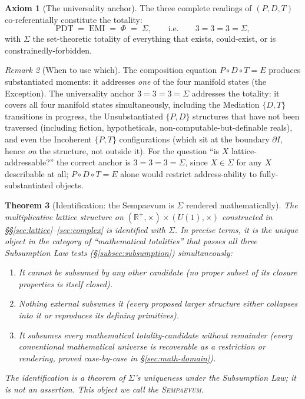 \documentclass[11pt,a4paper]{article}
\newtheorem{theorem}{Theorem}[section]
\theoremstyle{definition}
\newtheorem{axiom}[theorem]{Axiom}
\theoremstyle{remark}
\newtheorem{remark}[theorem]{Remark}
\newcommand{\R}{\mathbb{R}}
\newcommand{\Sempaevum}{\textsc{Sempaevum}}
\begin{document}
\begin{axiom}[The universality anchor]\label{ax:anchor}
The three complete readings of $(P,D,T)$ co-referentially constitute the totality:
\[
\mathrm{PDT} \;=\; \mathrm{EMI} \;=\; \Phi \;=\; \Sigma, \qquad \text{i.e.} \qquad 3=3=3=\Sigma,
\]
with $\Sigma$ the set-theoretic totality of everything that exists, could-exist, or is constrainedly-forbidden.
\end{axiom}

\begin{remark}[When to use which]
The composition equation $P\circ D\circ T=E$ produces substantiated moments: it addresses \emph{one} of the four manifold states (the Exception). The universality anchor $3=3=3=\Sigma$ addresses the totality: it covers all four manifold states simultaneously, including the Mediation $\{D,T\}$ transitions in progress, the Unsubstantiated $\{P,D\}$ structures that have not been traversed (including fiction, hypotheticals, non-computable-but-definable reals), and even the Incoherent $\{P,T\}$ configurations (which sit at the boundary $\partial I$, hence \emph{on} the structure, not outside it). For the question ``is $X$ lattice-addressable?'' the correct anchor is $3=3=3=\Sigma$, since $X\in\Sigma$ for any $X$ describable at all; $P\circ D\circ T=E$ alone would restrict address-ability to fully-substantiated objects.
\end{remark}

\begin{theorem}[Identification: the Sempaevum is $\Sigma$ rendered mathematically]\label{thm:identification-Sigma}
The multiplicative lattice structure on $(\R^{+},\times)\times (U(1),\times)$ constructed in \S\S\ref{sec:lattice}--\ref{sec:complex} is identified with $\Sigma$. In precise terms, it is the unique object in the category of ``mathematical totalities'' that passes all three Subsumption Law tests (\S\ref{subsec:subsumption}) simultaneously:
\begin{enumerate}[label=(\roman*),leftmargin=*]
\item It cannot be subsumed by any other candidate (no proper subset of its closure properties is itself closed).
\item Nothing external subsumes it (every proposed larger structure either collapses into it or reproduces its defining primitives).
\item It subsumes every mathematical totality-candidate without remainder (every conventional mathematical universe is recoverable as a restriction or rendering, proved case-by-case in \S\ref{sec:math-domain}).
\end{enumerate}
The identification is a theorem of $\Sigma$'s uniqueness under the Subsumption Law; it is \emph{not} an assertion. This object we call the \Sempaevum.
\end{theorem}
\end{document}
